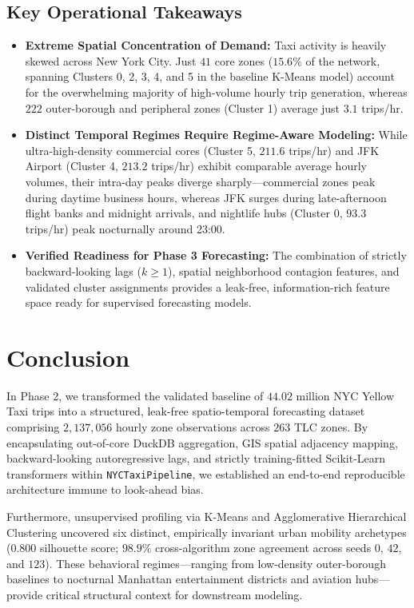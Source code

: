 \documentclass[11pt,a4paper]{article}
\begin{document}
\subsection{Key Operational Takeaways}
\begin{itemize}
    \item \textbf{Extreme Spatial Concentration of Demand:} Taxi activity is heavily skewed across New York City. Just $41$ core zones ($15.6\%$ of the network, spanning Clusters 0, 2, 3, 4, and 5 in the baseline K-Means model) account for the overwhelming majority of high-volume hourly trip generation, whereas $222$ outer-borough and peripheral zones (Cluster 1) average just $3.1$ trips/hr.
    \item \textbf{Distinct Temporal Regimes Require Regime-Aware Modeling:} While ultra-high-density commercial cores (Cluster 5, $211.6$ trips/hr) and JFK Airport (Cluster 4, $213.2$ trips/hr) exhibit comparable average hourly volumes, their intra-day peaks diverge sharply—commercial zones peak during daytime business hours, whereas JFK surges during late-afternoon flight banks and midnight arrivals, and nightlife hubs (Cluster 0, $93.3$ trips/hr) peak nocturnally around 23:00.
    \item \textbf{Verified Readiness for Phase 3 Forecasting:} The combination of strictly backward-looking lags ($k \ge 1$), spatial neighborhood contagion features, and validated cluster assignments provides a leak-free, information-rich feature space ready for supervised forecasting models.
\end{itemize}

\section{Conclusion}
In Phase 2, we transformed the validated baseline of $44.02$ million NYC Yellow Taxi trips into a structured, leak-free spatio-temporal forecasting dataset comprising $2,137,056$ hourly zone observations across $263$ TLC zones. By encapsulating out-of-core DuckDB aggregation, GIS spatial adjacency mapping, backward-looking autoregressive lags, and strictly training-fitted Scikit-Learn transformers within \texttt{NYCTaxiPipeline}, we established an end-to-end reproducible architecture immune to look-ahead bias.

Furthermore, unsupervised profiling via K-Means and Agglomerative Hierarchical Clustering uncovered six distinct, empirically invariant urban mobility archetypes ($0.800$ silhouette score; $98.9\%$ cross-algorithm zone agreement across seeds $0$, $42$, and $123$). These behavioral regimes—ranging from low-density outer-borough baselines to nocturnal Manhattan entertainment districts and aviation hubs—provide critical structural context for downstream modeling.
\end{document}
